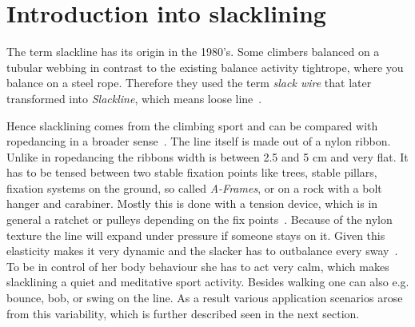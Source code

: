 \section{Introduction into slacklining}\label{3_1_introductionSlacklining}

The term slackline has its origin in the 1980's. Some climbers balanced on a tubular webbing in contrast to the existing balance activity tightrope, where you balance on a steel rope. Therefore they used the term \textit{slack wire} that later transformed into \textit{Slackline}, which means loose line~\cite{Zak2011-sl, Balcom2005-wl, MillerMauser2013-sl}.

Hence slacklining comes from the climbing sport and can be compared with ropedancing in a broader sense~\cite{Kleindl2011-bl}. The line itself is made out of a nylon ribbon. Unlike in ropedancing the ribbons width is between 2.5 and 5 cm and very flat. It has to be tensed between two stable fixation points like trees, stable pillars, fixation systems on the ground, so called \textit{A-Frames}, or on a rock with a bolt hanger and carabiner. Mostly this is done with a tension device, which is in general a ratchet or pulleys depending on the fix points~\cite{Kleindl2011-bl}. Because of the nylon texture the line will expand under pressure if someone stays on it. Given this elasticity makes it very dynamic and the slacker has to outbalance every sway~\cite{Kroiss2007-ab}. To be in control of her body behaviour she has to act very calm, which makes slacklining a quiet and meditative sport activity. Besides walking one can also e.g. bounce, bob, or swing on the line. As a result various application scenarios arose from this variability, which is further described seen in the next section.